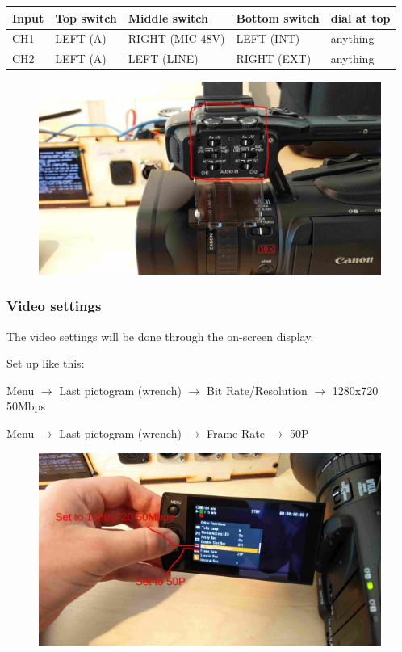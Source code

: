 \documentclass{article}
\begin{document}
\begin{tabular}{| l || l | l | l | l |}
Input & Top switch & Middle switch & Bottom switch & dial at top \\ \hline
CH1 & LEFT (A) & RIGHT (MIC 48V) & LEFT (INT) & anything \\
CH2 & LEFT (A) & LEFT (LINE) & RIGHT (EXT) & anything \\
\end{tabular}

\begin{figure}[H]
  \centering
\includegraphics[width = 120mm]{Canon04.jpg}
\end{figure}

\subsubsection{Video settings}
The video settings will be done through the on-screen display.

Set up like this:

Menu $\rightarrow$ Last pictogram (wrench) $\rightarrow$ Bit Rate/Resolution $\rightarrow$ 1280x720 50Mbps

Menu $\rightarrow$ Last pictogram (wrench) $\rightarrow$ Frame Rate $\rightarrow$ 50P

\begin{figure}[H]
  \centering
\includegraphics[width = 120mm]{Canon05.jpg}
\end{figure}
\end{document}
